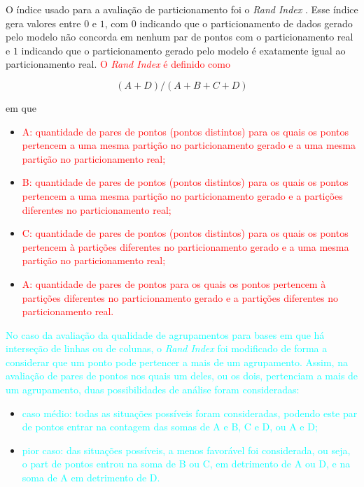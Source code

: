 \documentclass[
    12pt,                %
    oneside,            %
    a4paper,            %
    english,            %
    brazil                %
    ]{abntex2ppgsi}
\begin{document}

O índice usado para a avaliação de particionamento foi o \textit{Rand Index} \cite{Rand1971}. Esse índice gera valores entre $0$ e $1$, com $0$ indicando que o particionamento de dados gerado pelo modelo não concorda em nenhum par de pontos com o particionamento real e $1$ indicando que o particionamento gerado pelo modelo é exatamente igual ao particionamento real. \textcolor{red}{O \textit{Rand Index} é definido como}

\begin{equation}
(A + D) / (A + B + C + D)   \nonumber
\end{equation}

em que

\begin{itemize}
\item \textcolor{red}{A: quantidade de pares de pontos (pontos distintos) para os quais os pontos pertencem a uma mesma partição no particionamento gerado e a uma mesma partição no particionamento real;}
\item \textcolor{red}{B: quantidade de pares de pontos (pontos distintos) para os quais os pontos pertencem a uma mesma partição no particionamento gerado e a partições diferentes no particionamento real;}
\item \textcolor{red}{C: quantidade de pares de pontos (pontos distintos) para os quais os pontos pertencem à partições diferentes no particionamento gerado e a uma mesma partição no particionamento real;}
\item \textcolor{red}{A: quantidade de pares de pontos para os quais os pontos pertencem à partições diferentes no particionamento gerado e a partições diferentes no particionamento real.}
\end{itemize}

\textcolor{cyan}{No caso da avaliação da qualidade de agrupamentos para bases em que há interseção de linhas ou de colunas, o \textit{Rand Index} foi modificado de forma a considerar que um ponto pode pertencer a mais de um agrupamento. Assim, na avaliação de pares de pontos nos quais um deles, ou os dois, pertenciam a mais de um agrupamento, duas possibilidades de análise foram consideradas:}

\begin{itemize}
\item \textcolor{cyan}{caso médio: todas as situações possíveis foram consideradas, podendo este par de pontos entrar na contagem das somas de A e B, C e D, ou A e D;}
\item \textcolor{cyan}{pior caso: das situações possíveis, a menos favorável foi considerada, ou seja, o part de pontos entrou na soma de B ou C, em detrimento de A ou D, e na soma de A em detrimento de D.}
\end{itemize}
\end{document}
